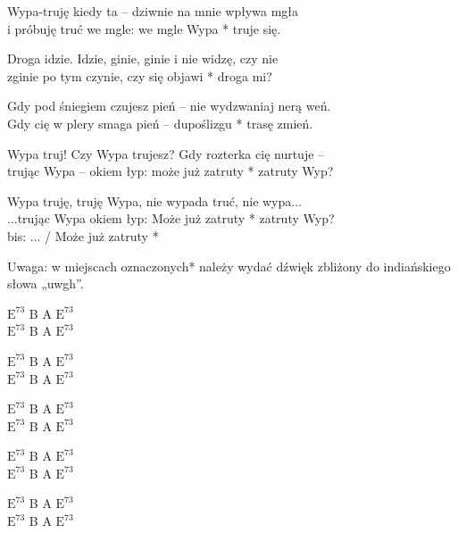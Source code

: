 \begin{text}
    \small{
    Wypa-truję kiedy ta – dziwnie na mnie wpływa mgła\\
    i próbuję truć we mgle: we mgle Wypa * truje się.

    Droga idzie. Idzie, ginie, ginie i nie widzę, czy nie\\
    zginie po tym czynie, czy się objawi * droga mi?

    Gdy pod śniegiem czujesz pień – nie wydzwaniaj nerą weń.\\
    Gdy cię w plery smaga pień – dupoślizgu * trasę zmień.

    Wypa truj! Czy Wypa trujesz? Gdy rozterka cię nurtuje –\\
    trując Wypa – okiem łyp: może już zatruty * zatruty Wyp?

    Wypa truję, truję Wypa, nie wypada truć, nie wypa...\\
    ...trując Wypa okiem łyp: Może już zatruty * zatruty Wyp?\\
    bis: ... / Może już zatruty *

    Uwaga: w miejscach oznaczonych* należy wydać dźwięk
    zbliżony do indiańskiego słowa „uwgh”.
    }
\end{text}
\begin{chord}
    \small{
    $\mathrm{E^{7 3}}$ B A $\mathrm{E^{7 3}}$\\
    $\mathrm{E^{7 3}}$ B A $\mathrm{E^{7 3}}$

    $\mathrm{E^{7 3}}$ B A $\mathrm{E^{7 3}}$\\
    $\mathrm{E^{7 3}}$ B A $\mathrm{E^{7 3}}$

    $\mathrm{E^{7 3}}$ B A $\mathrm{E^{7 3}}$\\
    $\mathrm{E^{7 3}}$ B A $\mathrm{E^{7 3}}$

    $\mathrm{E^{7 3}}$ B A $\mathrm{E^{7 3}}$\\
    $\mathrm{E^{7 3}}$ B A $\mathrm{E^{7 3}}$

    $\mathrm{E^{7 3}}$ B A $\mathrm{E^{7 3}}$\\
    $\mathrm{E^{7 3}}$ B A $\mathrm{E^{7 3}}$
    }
\end{chord}
